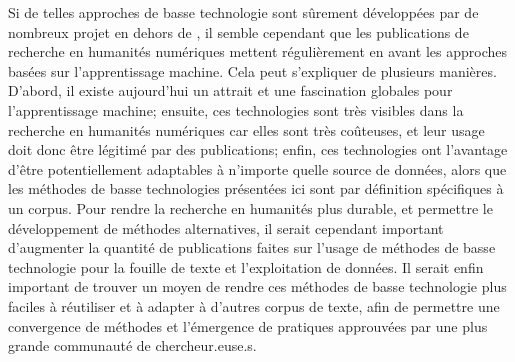 Si de telles approches de basse technologie sont sûrement développées par de nombreux projet en dehors de \mssktb{}, il semble cependant que les publications de recherche en humanités numériques mettent régulièrement en avant les approches basées sur l'apprentissage machine. Cela peut s'expliquer de plusieurs manières. D'abord, il existe aujourd'hui un attrait et une fascination globales pour l'apprentissage machine; ensuite, ces technologies sont très visibles dans la recherche en humanités numériques car elles sont très coûteuses, et leur usage doit donc être légitimé par des publications; enfin, ces technologies ont l'avantage d'être potentiellement adaptables à n'importe quelle source de données, alors que les méthodes de basse technologies présentées ici sont par définition spécifiques à un corpus. Pour rendre la recherche en humanités plus durable, et permettre le développement de méthodes alternatives, il serait cependant important d'augmenter la quantité de publications faites sur l'usage de méthodes de basse technologie pour la fouille de texte et l'exploitation de données. Il serait enfin important de trouver un moyen de rendre ces méthodes de basse technologie plus faciles à réutiliser et à adapter à d'autres corpus de texte, afin de permettre une convergence de méthodes et l'émergence de pratiques approuvées par une plus grande communauté de chercheur.euse.s.
